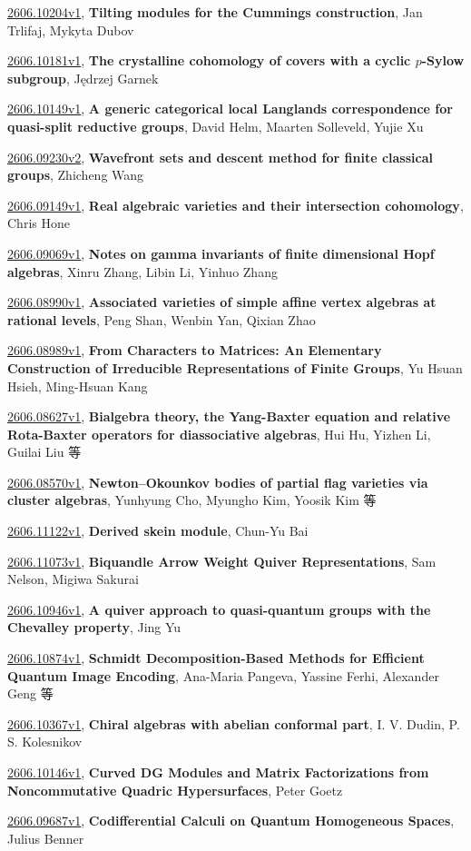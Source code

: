 \documentclass[9pt, a4paper]{article}
\theoremstyle{plain}
\theoremstyle{definition}
\theoremstyle{remark}
\newcommand{\arxiv}[3]{\href{https://arxiv.org/abs/#1}{#1}, \textbf{\textcolor{arxivblue}{#2}}, #3}
\begin{document}
\arxiv{2606.10204v1}{Tilting modules for the Cummings construction}{Jan Trlifaj, Mykyta Dubov}

\arxiv{2606.10181v1}{The crystalline cohomology of covers with a cyclic $p$-Sylow subgroup}{Jędrzej Garnek}

\arxiv{2606.10149v1}{A generic categorical local Langlands correspondence for quasi-split reductive groups}{David Helm, Maarten Solleveld, Yujie Xu}

\arxiv{2606.09230v2}{Wavefront sets and descent method for finite classical groups}{Zhicheng Wang}

\arxiv{2606.09149v1}{Real algebraic varieties and their intersection cohomology}{Chris Hone}

\arxiv{2606.09069v1}{Notes on gamma invariants of finite dimensional Hopf algebras}{Xinru Zhang, Libin Li, Yinhuo Zhang}

\arxiv{2606.08990v1}{Associated varieties of simple affine vertex algebras at rational levels}{Peng Shan, Wenbin Yan, Qixian Zhao}

\arxiv{2606.08989v1}{From Characters to Matrices: An Elementary Construction of Irreducible Representations of Finite Groups}{Yu Hsuan Hsieh, Ming-Hsuan Kang}

\arxiv{2606.08627v1}{Bialgebra theory, the Yang-Baxter equation and relative Rota-Baxter operators for diassociative algebras}{Hui Hu, Yizhen Li, Guilai Liu 等}

\arxiv{2606.08570v1}{Newton--Okounkov bodies of partial flag varieties via cluster algebras}{Yunhyung Cho, Myungho Kim, Yoosik Kim 等}

\arxiv{2606.11122v1}{Derived skein module}{Chun-Yu Bai}

\arxiv{2606.11073v1}{Biquandle Arrow Weight Quiver Representations}{Sam Nelson, Migiwa Sakurai}

\arxiv{2606.10946v1}{A quiver approach to quasi-quantum groups with the Chevalley property}{Jing Yu}

\arxiv{2606.10874v1}{Schmidt Decomposition-Based Methods for Efficient Quantum Image Encoding}{Ana-Maria Pangeva, Yassine Ferhi, Alexander Geng 等}

\arxiv{2606.10367v1}{Chiral algebras with abelian conformal part}{I. V. Dudin, P. S. Kolesnikov}

\arxiv{2606.10146v1}{Curved DG Modules and Matrix Factorizations from Noncommutative Quadric Hypersurfaces}{Peter Goetz}

\arxiv{2606.09687v1}{Codifferential Calculi on Quantum Homogeneous Spaces}{Julius Benner}
\end{document}

